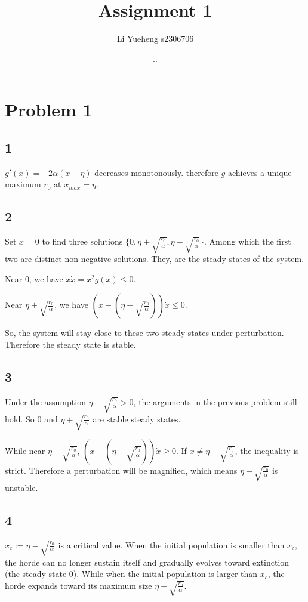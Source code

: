 \documentclass{article}
\renewcommand{\today}{\number\year.\number\month.\number\day}
\begin{document}
\title{Assignment 1}
\author{Li Yueheng s2306706}
\date{\today}
\maketitle


\section*{Problem 1}
\subsection*{1}
$g'(x)=-2\alpha(x-\eta)$ decreases monotonously. therefore $g$ achieves a unique maximum $r_0$ at $x_{max}=\eta$.


\subsection*{2}
Set $\dot{x}=0$ to find three solutions $\{0,\eta+\sqrt{\frac{r_0}{\alpha}},\eta-\sqrt{\frac{r_0}{\alpha}}\}$. Among which the first two are distinct non-negative solutions. They, are the steady states of the system.

Near $0$, we have $ x\dot{x} =x^2 g(x) \leq 0$. 

Near $\eta+\sqrt{\frac{r_0}{\alpha}}$, we have $(x-(\eta+\sqrt{\frac{r_0}{\alpha}}))\dot{x}\leq 0$.

So, the system will stay close to these two steady states under perturbation. Therefore the steady state is stable.


\subsection*{3}
Under the assumption $\eta-\sqrt{\frac{r_0}{\alpha}}>0$, the arguments in the previous problem still hold. So $0$ and $\eta+\sqrt{\frac{r_0}{\alpha}}$ are stable steady states. 

While near $\eta-\sqrt{\frac{r_0}{\alpha}}$, $(x-(\eta-\sqrt{\frac{r_0}{\alpha}}))\dot{x}\geq 0$. If $x\neq \eta-\sqrt{\frac{r_0}{\alpha}}$, the inequality is strict. Therefore a perturbation will be magnified, which means $\eta-\sqrt{\frac{r_0}{\alpha}}$ is unstable.


\subsection*{4}
$x_c:=\eta-\sqrt{\frac{r_0}{\alpha}}$ is a critical value. When the initial population is smaller than $x_c$, the horde can no longer sustain itself and gradually evolves toward extinction (the steady state $0$). While when the initial population is larger than $x_c$, the horde expands toward its maximum size $\eta+\sqrt{\frac{r_0}{\alpha}}$.
\end{document}
